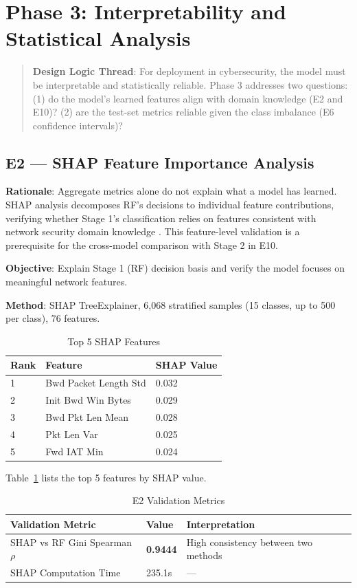 \documentclass[sigconf]{acmart}
\begin{document}
\section{Phase 3: Interpretability and Statistical Analysis}
\begin{quote}
\textbf{Design Logic Thread}: For deployment in cybersecurity, the model must be interpretable and statistically reliable. Phase 3 addresses two questions: (1) do the model's learned features align with domain knowledge (E2 and E10)? (2) are the test-set metrics reliable given the class imbalance (E6 confidence intervals)?
\end{quote}

\subsection{E2 --- SHAP Feature Importance Analysis}
\textbf{Rationale}: Aggregate metrics alone do not explain what a model has learned. SHAP analysis decomposes RF's decisions to individual feature contributions, verifying whether Stage 1's classification relies on features consistent with network security domain knowledge \cite{1}. This feature-level validation is a prerequisite for the cross-model comparison with Stage 2 in E10.

\textbf{Objective}: Explain Stage 1 (RF) decision basis and verify the model focuses on meaningful network features.

\textbf{Method}: SHAP TreeExplainer, 6,068 stratified samples (15 classes, up to 500 per class), 76 features.

\begin{table}[!h]
\caption{Top 5 SHAP Features}
\label{tab:shap_features}
\begin{tabular}{lll}
\toprule
\textbf{Rank} & \textbf{Feature} & \textbf{SHAP Value} \\
\midrule
1 & Bwd Packet Length Std & 0.032 \\
2 & Init Bwd Win Bytes & 0.029 \\
3 & Bwd Pkt Len Mean & 0.028 \\
4 & Pkt Len Var & 0.025 \\
5 & Fwd IAT Min & 0.024 \\
\bottomrule
\end{tabular}
\end{table}
\noindent Table~\ref{tab:shap_features} lists the top 5 features by SHAP value.

\begin{table}[!t]
\caption{E2 Validation Metrics}
\label{tab:e2_validation}
\begin{tabular}{p{5.5cm}p{2.5cm}p{8.4cm}}
\toprule
\textbf{Validation Metric} & \textbf{Value} & \textbf{Interpretation} \\
\midrule
SHAP vs RF Gini Spearman $\rho$ & \textbf{0.9444} & High consistency between two methods \\
SHAP Computation Time & 235.1s & --- \\
\bottomrule
\end{tabular}
\end{table}
\end{document}
